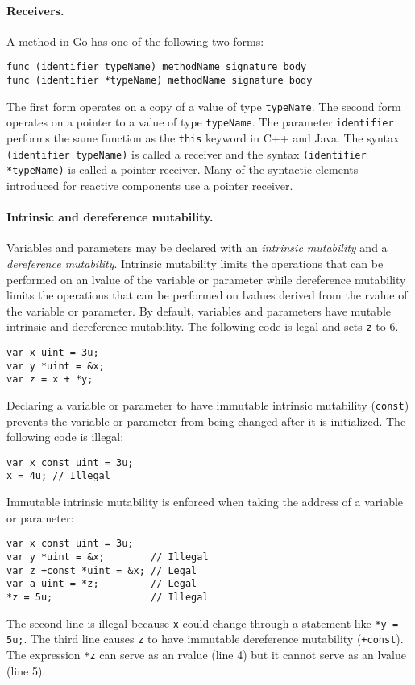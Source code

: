 \paragraph{Receivers.}
A method in Go has one of the following two forms:
\begin{verbatim}
func (identifier typeName) methodName signature body
func (identifier *typeName) methodName signature body
\end{verbatim}
The first form operates on a copy of a value of type \verb+typeName+.
The second form operates on a pointer to a value of type \verb+typeName+.
The parameter \verb+identifier+ performs the same function as the \verb+this+ keyword in C++ and Java.
The syntax \verb+(identifier typeName)+ is called a receiver and the syntax \verb+(identifier *typeName)+ is called a pointer receiver.
Many of the syntactic elements introduced for reactive components use a pointer receiver.

\paragraph{Intrinsic and dereference mutability.}
Variables and parameters may be declared with an \emph{intrinsic mutability} and a \emph{dereference mutability}.
Intrinsic mutability limits the operations that can be performed on an lvalue of the variable or parameter while dereference mutability limits the operations that can be performed on lvalues derived from the rvalue of the variable or parameter.
By default, variables and parameters have mutable intrinsic and dereference mutability.
The following code is legal and sets \verb+z+ to 6.
\begin{verbatim}
var x uint = 3u;
var y *uint = &x;
var z = x + *y;
\end{verbatim}

Declaring a variable or parameter to have immutable intrinsic mutability (\verb+const+) prevents the variable or parameter from being changed after it is initialized.
The following code is illegal:
\begin{verbatim}
var x const uint = 3u;
x = 4u; // Illegal
\end{verbatim}
Immutable intrinsic mutability is enforced when taking the address of a variable or parameter:
\begin{verbatim}
var x const uint = 3u;
var y *uint = &x;        // Illegal
var z +const *uint = &x; // Legal
var a uint = *z;         // Legal
*z = 5u;                 // Illegal
\end{verbatim}
The second line is illegal because \verb+x+ could change through a statement like \verb+*y = 5u;+.
The third line causes \verb+z+ to have immutable dereference mutability (\verb|+const|).
The expression \verb+*z+ can serve as an rvalue (line 4) but it cannot serve as an lvalue (line 5).

